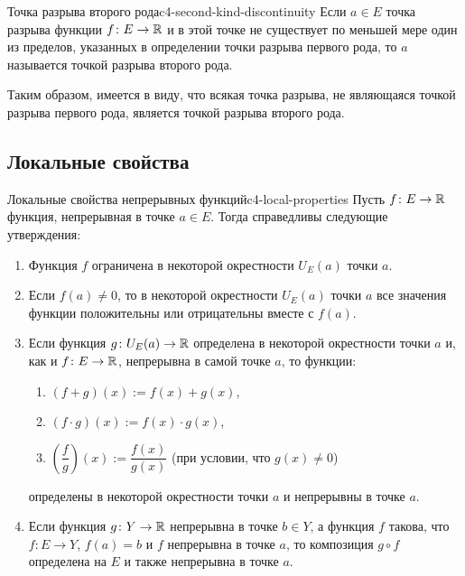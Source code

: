 \begin{definition}{Точка разрыва второго рода}{c4-second-kind-discontinuity}
  Если $a\in E$ \textemdash{} точка разрыва функции $f\colon E\to\mathbb{R}$ и в
  этой точке не существует по меньшей мере один из пределов, указанных в
  определении точки разрыва первого рода, то $a$ называется точкой разрыва
  второго рода.

  Таким образом, имеется в виду, что всякая точка разрыва, не являющаяся
  точкой разрыва первого рода, является точкой разрыва второго рода.
\end{definition}


\subsection{Локальные свойства}

\begin{theorem}{Локальные свойства непрерывных функций}{c4-local-properties}
  Пусть $f\colon E\to\mathbb{R}$ \textemdash{} функция, непрерывная в точке
  $a\in E$. Тогда справедливы следующие утверждения:
  \begin{enumerate}[label=\arabic*${}^{\circ}$.]
    \item Функция $f$ ограничена в некоторой окрестности $U_E(a)$ точки
      $a$.
    \item Если $f(a)\ne0$, то в некоторой окрестности $U_E(a)$ точки $a$
      все значения функции положительны или отрицательны вместе с $f(a)$.
    \item Если функция $g\colon U_E(a)\to\mathbb{R}$ определена в некоторой
      окрестности точки $a$ и, как и $f\colon E\to\mathbb{R}$, непрерывна в самой
      точке $a$, то функции:
      \begin{enumerate}[label=\alph*)]
        \item $(f+g)(x):=f(x)+g(x)$,
        \item $(f\cdot g)(x):=f(x)\cdot g(x)$,
        \item $\left(\dfrac fg\right)(x):=\dfrac{f(x)}{g(x)}$
          (при условии, что $g(x)\ne0$)
      \end{enumerate}
      определены в некоторой окрестности точки $a$ и непрерывны в точке
      $a$.
    \item Если функция $g\colon Y\to\mathbb{R}$ непрерывна в точке $b\in Y$, а
      функция $f$ такова, что $f\colon E\to Y$, $f(a)=b$ и $f$ непрерывна в
      точке $a$, то композиция $g\circ f$ определена на $E$ и также
      непрерывна в точке $a$.
  \end{enumerate}
\end{theorem}

